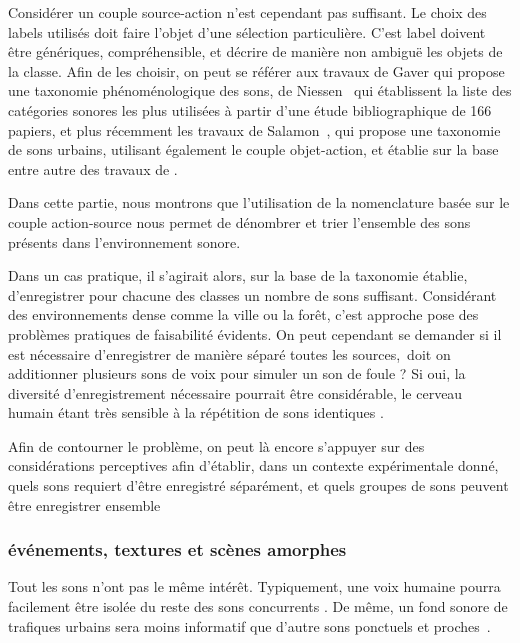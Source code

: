 Considérer un couple source-action n'est cependant pas suffisant. Le choix des labels utilisés doit faire l'objet d'une sélection particulière. C'est label doivent être génériques, compréhensible, et décrire de manière non ambiguë les objets de la classe. Afin de les choisir, on peut se référer aux travaux de Gaver \citep{gaver1993world} qui propose une taxonomie phénoménologique des sons, de Niessen~\al \citep{niessen2010categories} qui établissent la liste des catégories sonores les plus utilisées à partir d'une étude bibliographique de 166 papiers, et plus récemment les travaux de Salamon~\al \citep{Salamon14}, qui propose une taxonomie de sons urbains, utilisant également le couple objet-action, et établie sur la base entre autre des travaux de \citep{brown2011towards}.

Dans cette partie, nous montrons que  l'utilisation de la nomenclature basée sur le couple action-source nous permet de dénombrer et trier l'ensemble des sons présents dans l'environnement sonore.

Dans un cas pratique, il s'agirait alors, sur la base de la taxonomie établie, d'enregistrer pour chacune des classes  un nombre de sons suffisant. Considérant des environnements dense comme la ville ou la forêt, c'est approche pose des problèmes pratiques de faisabilité évidents. On peut cependant se demander si il est nécessaire d'enregistrer de manière séparé toutes les sources,\eg~doit on additionner plusieurs sons de voix pour simuler un son de foule ? Si oui, la diversité d'enregistrement nécessaire pourrait être considérable, le cerveau humain étant très sensible à la répétition de sons identiques \citep{agus2010rapid}.

Afin de contourner le problème, on peut là encore s’appuyer sur des considérations perceptives afin d'établir, dans un contexte expérimentale donné, quels sons requiert d'être enregistré séparément, et quels groupes de sons peuvent être enregistrer ensemble

\subsubsection{événements, textures et scènes amorphes}

Tout les sons n'ont pas le même intérêt. Typiquement, une voix humaine pourra facilement être isolée du reste des sons concurrents \citep{carlyon2004brain}. De même, un fond sonore de trafiques urbains sera moins informatif que d'autre sons ponctuels et proches~\citep{southworth1969sonic}.

